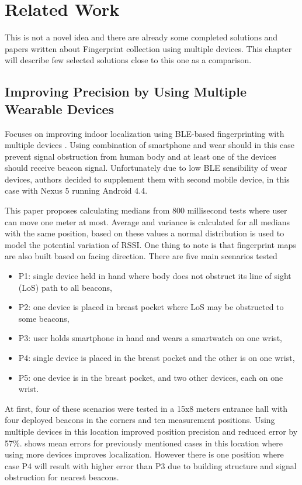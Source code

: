 \chapter{Related Work}\label{sec:RelatedWork}
This is not a novel idea and there are already some completed solutions and papers written about Fingerprint collection using multiple devices. This chapter will describe few selected solutions close to this one as a comparison.

\section{Improving Precision by Using Multiple Wearable Devices}\label{sec:IPUMWD}
Focuses on improving indoor localization using BLE-based fingerprinting with multiple devices \cite{IPBLEIUMWD}. Using combination of smartphone and wear should in this case prevent signal obstruction from human body and at least one of the devices should receive beacon signal. Unfortunately due to low BLE sensibility of wear devices, authors decided to supplement them with second mobile device, in this case with Nexus 5 running Android 4.4.

This paper proposes calculating medians from 800 millisecond tests where user can move one meter at most. Average and variance is calculated for all medians with the same position, based on these values a normal distribution is used to model the potential variation of RSSI. One thing to note is that fingerprint maps are also built based on facing direction. There are five main scenarios tested

\begin{itemize}
	\item P1: single device held in hand where body does not obstruct its line of sight (LoS) path to all beacons,
	\item P2: one device is placed in breast pocket where LoS may be obstructed to some beacons,
	\item P3: user holds smartphone in hand and wears a smartwatch on one wrist,
	\item P4: single device is placed in the breast pocket and the other is on one wrist,
	\item P5: one device is in the breast pocket, and two other devices, each on one wrist.
\end{itemize} 

At first, four of these scenarios were tested in a 15x8 meters entrance hall with four deployed beacons in the corners and ten measurement positions. Using multiple devices in this location improved position precision and reduced error by 57\%.  shows mean errors for previously mentioned cases in this location where using more devices improves localization. However there is one position where case P4 will result with higher error than P3 due to building structure and signal obstruction for nearest beacons.

